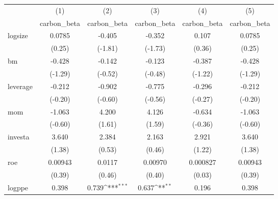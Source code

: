 {
\def\sym#1{\ifmmode^{#1}\else\(^{#1}\)\fi}
\begin{tabular}{l*{5}{c}}
\hline\hline
            &\multicolumn{1}{c}{(1)}&\multicolumn{1}{c}{(2)}&\multicolumn{1}{c}{(3)}&\multicolumn{1}{c}{(4)}&\multicolumn{1}{c}{(5)}\\
            &\multicolumn{1}{c}{carbon\_beta}&\multicolumn{1}{c}{carbon\_beta}&\multicolumn{1}{c}{carbon\_beta}&\multicolumn{1}{c}{carbon\_beta}&\multicolumn{1}{c}{carbon\_beta}\\
\hline
logsize     &      0.0785         &      -0.405         &      -0.352         &       0.107         &      0.0785         \\
            &      (0.25)         &     (-1.81)         &     (-1.73)         &      (0.36)         &      (0.25)         \\
[1em]
bm          &      -0.428         &      -0.142         &      -0.123         &      -0.387         &      -0.428         \\
            &     (-1.29)         &     (-0.52)         &     (-0.48)         &     (-1.22)         &     (-1.29)         \\
[1em]
leverage    &      -0.212         &      -0.902         &      -0.775         &      -0.296         &      -0.212         \\
            &     (-0.20)         &     (-0.60)         &     (-0.56)         &     (-0.27)         &     (-0.20)         \\
[1em]
mom         &      -1.063         &       4.200         &       4.126         &      -0.634         &      -1.063         \\
            &     (-0.60)         &      (1.61)         &      (1.59)         &     (-0.36)         &     (-0.60)         \\
[1em]
investa     &       3.640         &       2.384         &       2.163         &       2.921         &       3.640         \\
            &      (1.38)         &      (0.53)         &      (0.46)         &      (1.22)         &      (1.38)         \\
[1em]
roe         &     0.00943         &      0.0117         &     0.00970         &    0.000827         &     0.00943         \\
            &      (0.39)         &      (0.46)         &      (0.40)         &      (0.03)         &      (0.39)         \\
[1em]
logppe      &       0.398         &       0.739\sym{***}&       0.637\sym{**} &       0.196         &       0.398         \\

\end{tabular}}
